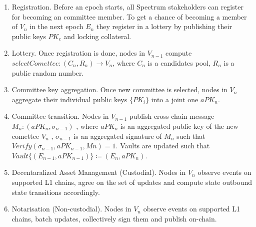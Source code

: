 \begin{enumerate}
    \item Registration.
    Before an epoch starts, all Spectrum stakeholders can register for becoming an committee member.
    To get a chance of becoming a member of $V_n$ in the next epoch $E_n$ they register in a lottery
    by publishing their public keys $PK_c$ and locking collateral.
    \item Lottery.
    Once registration is done, nodes in $V_{n-1}$ compute $selectComettee: (C_n, R_n) \rightarrow V_n$,
    where  $C_n$ is a candidates pool, $R_n$ is a public random number.
    \item Committee key aggregation.
    Once new committee is selected, nodes in $V_n$ aggregate their individual public keys $\{PK_i\}$ into
    a joint one $aPK_n$.
    \item Committee transition.
    Nodes in $V_{n-1}$ publish cross-chain message $M_n : (aPK_n, \sigma_{n-1})$ , where $aPK_n$ is
    an aggregated public key of the new comettee $V_n$ , $\sigma_{n-1}$ is an aggregated signature of
    $M_n$ such that $Verify(\sigma_{n-1}, aPK_{n-1}, Mn) = 1$.
    Vaults are updated such that $Vault\{(E_{n-1}, aPK_{n-1})\} \coloneqq (E_n, aPK_n)$.
    \item Decentaralized Asset Management (Custodial).
    Nodes in $V_n$ observe events on supported L1 chains, agree on the set of updates
    and compute state outbound state transitions accordingly.
    \item Notarisation (Non-custodial).
    Nodes in $V_n$ observe events on supported L1 chains, batch updates, collectively sign them and
    publish on-chain.
\end{enumerate}